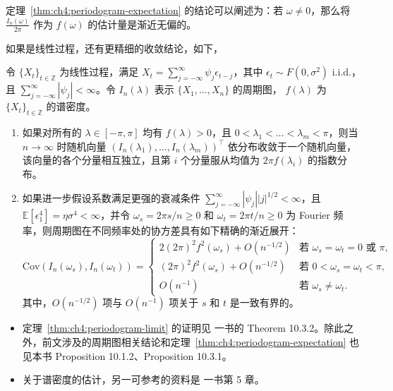 定理~\ref{thm:ch4:periodogram-expectation} 的结论可以阐述为：若 $\omega\ne 0$，那么将 $\frac{I_n(\omega)}{2\pi}$ 作为 $f(\omega)$ 的估计量是渐近无偏的。

如果是线性过程，还有更精细的收敛结论，如下，

\begin{theorem}[周期图的有限维极限]
\label{thm:ch4:periodogram-limit}

令 $\{X_{t}\}_{t\in\mathbb Z}$ 为线性过程，满足 $X_{t} = \sum_{j = -\infty}^{\infty} \psi_j \epsilon_{t - j}$，其中 $\epsilon_{t}\sim F(0, \sigma^{2})$ i.i.d.，且 $\sum_{j = -\infty}^{\infty} |\psi_{j}| < \infty$。令 $I_{n}(\lambda)$ 表示 $\{X_{1}, \dots , X_{n}\}$ 的周期图， $f (\lambda)$ 为 $\{X_{t}\}_{t\in\mathbb Z}$ 的谱密度。

\begin{enumerate}
\def\labelenumi{\arabic{enumi}.}
\tightlist
\item
  如果对所有的 $\lambda \in [-\pi, \pi]$ 均有 $f(\lambda) > 0$，且 $0 < \lambda_{1} < \dots < \lambda_{m} < \pi$，则当 $n\to\infty$ 时随机向量 $(I_{n}(\lambda_{1}), \dots , I_{n}(\lambda_{m}))^{\top}$ 依分布收敛于一个随机向量，该向量的各个分量相互独立，且第 $i$ 个分量服从均值为 $2\pi f(\lambda_{i})$ 的指数分布。
\item
  如果进一步假设系数满足更强的衰减条件 $\sum_{j = -\infty}^{\infty} |\psi_{j}| |j|^{1/2} < \infty$，且 $\mathbb{E}[\epsilon_{1}^{4}] = \eta \sigma^{4} < \infty$，并令 $\omega_s = 2\pi s / n \geq 0$ 和 $\omega_t = 2\pi t / n \geq 0$ 为 Fourier 频率，则周期图在不同频率处的协方差具有如下精确的渐近展开：
  \[  \mathrm{Cov}(I_n(\omega_s), I_n(\omega_t)) = \begin{cases} 2(2\pi)^2 f^2(\omega_s) + O(n^{-1/2}) & \text{若 } \omega_s = \omega_t = 0 \text{ 或 } \pi, \\ (2\pi)^2 f^2(\omega_s) + O(n^{-1/2}) & \text{若 } 0 < \omega_s = \omega_t < \pi, \\ O(n^{-1}) & \text{若 } \omega_s \neq \omega_t. \end{cases}
  \]  其中，$O(n^{-1/2})$ 项与 $O(n^{-1})$ 项关于 $s$ 和 $t$ 是一致有界的。
\end{enumerate}

\end{theorem}

\begin{remark}

\begin{itemize}
\tightlist
\item
  定理~\ref{thm:ch4:periodogram-limit} 的证明见 \cite{brockwelldavis2006} 一书的 Theorem 10.3.2。除此之外，前文涉及的周期图相关结论和定理~\ref{thm:ch4:periodogram-expectation} 也见本书 Proposition 10.1.2、Proposition 10.3.1。
\item
  关于谱密度的估计，另一可参考的资料是 \cite{brillinger2001} 一书第 5 章。
\end{itemize}
\end{remark}

